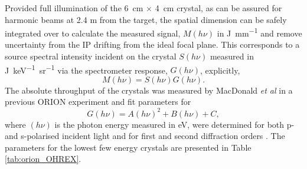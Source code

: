 Provided full illumination of the \qty{6}{cm} $\times$ \qty{4}{cm} crystal, as can be assured for harmonic beams at 2.4 m from the target, the spatial dimension can be safely integrated over to calculate the measured signal, $M(h\nu)$ in \unit{J.mm^{-1}} and remove uncertainty from the IP drifting from the ideal focal plane.
This corresponds to a source spectral intensity incident on the crystal $S(h\nu)$ measured in \unit{J.keV^{-1}.sr^{-1}} via the spectrometer response, $G(h\nu)$, explicitly,
\begin{equation}
	M(h\nu) = S(h\nu)G(h\nu).
\end{equation}
The absolute throughput of the crystals was measured by MacDonald \textit{et al} in a previous ORION experiment and fit parameters for 
\begin{equation}
	G(h\nu) = A(h\nu)^2 + B(h\nu) + C,
\end{equation}
where $(h\nu)$ is the photon energy measured in eV, were determined for both p- and s-polarised incident light and for first and second diffraction orders \cite{macdonaldAbsoluteThroughputCalibration2021}. The parameters for the lowest few energy crystals are presented in Table \ref{tab:orion_OHREX}.
